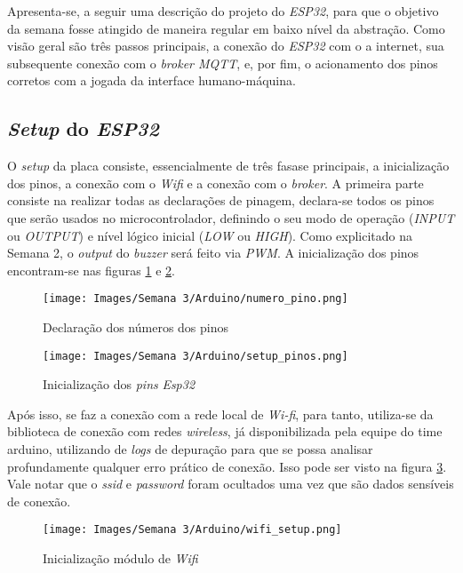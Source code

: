 \documentclass[amsmath,amssymb,floatfix]{report}
\begin{document}
Apresenta-se, a seguir uma descrição do projeto do \textit{ESP32}, para que o objetivo da semana fosse atingido de maneira regular em baixo nível da abstração. Como visão geral são três passos principais, a conexão do \textit{ESP32} com o a internet, sua subsequente conexão com o \textit{broker MQTT}, e, por fim, o acionamento dos pinos corretos com a jogada da interface humano-máquina.


\subsection{\textit{Setup} do \textit{ESP32}}
\label{subsec:arduinosetup3}

O \textit{setup} da placa consiste, essencialmente de três fasase principais, a inicialização dos pinos, a conexão com o \textit{Wifi} e a conexão com o \textit{broker}. A primeira parte consiste na realizar todas as declarações de pinagem, declara-se todos os pinos que serão usados no microcontrolador, definindo o seu modo de operação (\textit{INPUT} ou \textit{OUTPUT}) e nível lógico inicial (\textit{LOW} ou \textit{HIGH}). Como explicitado na Semana 2, o \textit{output} do \textit{buzzer} será feito via \textit{PWM}. A inicialização dos pinos encontram-se nas figuras \ref{fig:pinsetup3} e \ref{fig:pinInit3}.

\begin{figure}[H]
\centering
\texttt{[image: Images/Semana 3/Arduino/numero\_pino.png]} 
    \caption{Declaração dos números dos pinos}
    \label{fig:pinsetup3}
\end{figure}

\begin{figure}[H]
\centering
\texttt{[image: Images/Semana 3/Arduino/setup\_pinos.png]} 
    \caption{Inicialização dos \textit{pins} \textit{Esp32}}
    \label{fig:pinInit3}
\end{figure}

Após isso, se faz a conexão com a rede local de \textit{Wi-fi}, para tanto, utiliza-se da biblioteca de conexão com redes \textit{wireless}, já disponibilizada pela equipe do time arduino, utilizando de \textit{logs} de depuração para que se possa analisar profundamente qualquer erro prático de conexão. Isso pode ser visto na figura \ref{fig:wifi3}. Vale notar que o \textit{ssid} e \textit{password} foram ocultados uma vez que são dados sensíveis de conexão.

\begin{figure}[H]
\centering
\texttt{[image: Images/Semana 3/Arduino/wifi\_setup.png]} 
    \caption{Inicialização módulo de \textit{Wifi}}
    \label{fig:wifi3}
\end{figure}
\end{document}
